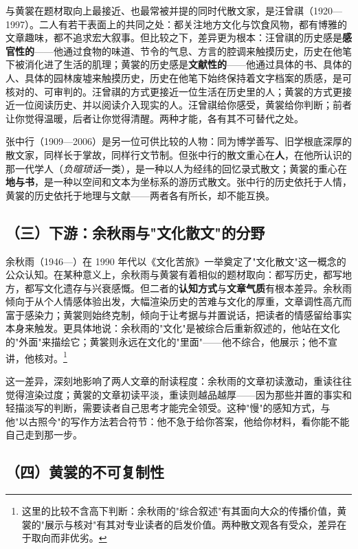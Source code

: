 \documentclass[UTF8,fontset=none,zihao=-4,a4paper]{ctexart}
\begin{document}
与黄裳在题材取向上最接近、也最常被并提的同时代散文家，是汪曾祺（1920—1997）。二人有若干表面上的共同之处：都关注地方文化与饮食风物，都有博雅的文章趣味，都不追求宏大叙事。但比较之下，差异更为根本：汪曾祺的历史感是\textbf{感官性的}——他通过食物的味道、节令的气息、方言的腔调来触摸历史，历史在他笔下被消化进了生活的肌理；黄裳的历史感是\textbf{文献性的}——他通过具体的书、具体的人、具体的园林废墟来触摸历史，历史在他笔下始终保持着文字档案的质感，是可核对的、可审判的。汪曾祺的方式更接近一位生活在历史里的人；黄裳的方式更接近一位阅读历史、并以阅读介入现实的人。汪曾祺给你感受，黄裳给你判断；前者让你觉得温暖，后者让你觉得清醒。两种才能，各有其不可替代之处。


张中行（1909—2006）是另一位可供比较的人物：同为博学善写、旧学根底深厚的散文家，同样长于掌故，同样行文节制。但张中行的散文重心在\textbf{人}，在他所认识的那一代学人（\textit{负暄琐话}一类），是一种以人为经纬的回忆录式散文；黄裳的重心在\textbf{地与书}，是一种以空间和文本为坐标系的游历式散文。张中行的历史依托于人情，黄裳的历史依托于地理与文献——两者各有所长，却不能互换。


\subsection{（三）下游：余秋雨与"文化散文"的分野}


余秋雨（1946—）在 1990 年代以《文化苦旅》一举奠定了"文化散文"这一概念的公众认知。在某种意义上，余秋雨与黄裳有着相似的题材取向：都写历史，都写地方，都写文化遗存与兴衰感慨。但二者的\textbf{认知方式}与\textbf{文章气质}有根本差异。余秋雨倾向于从个人情感体验出发，大幅渲染历史的苦难与文化的厚重，文章调性高亢而富于感染力；黄裳则始终克制，倾向于让考据与并置说话，把读者的情感留给事实本身来触发。更具体地说：余秋雨的"文化"是被综合后重新叙述的，他站在文化的"外面"来描绘它；黄裳则永远在文化的"里面"——他不综合，他展示；他不宣讲，他核对。\footnote{这里的比较不含高下判断：余秋雨的"综合叙述"有其面向大众的传播价值，黄裳的"展示与核对"有其对专业读者的启发价值。两种散文观各有受众，差异在于取向而非优劣。}


这一差异，深刻地影响了两人文章的耐读程度：余秋雨的文章初读激动，重读往往觉得渲染过度；黄裳的文章初读平淡，重读则越品越厚——因为那些并置的事实和轻描淡写的判断，需要读者自己思考才能完全领受。这种"慢"的感知方式，与他"以古照今"的写作方法若合符节：他不急于给你答案，他给你材料，看你能不能自己走到那一步。


\subsection{（四）黄裳的不可复制性}
\end{document}
